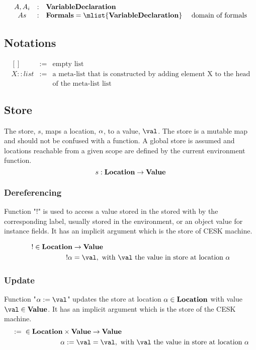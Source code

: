 \documentclass{article}
\begin{document}
\[
  \begin{array}{ccll}
	\formal, \formali{i} & : & \dvardecl\\
	\formals & : & \dformals = \mlist{\dvardecl} &\textrm{ domain of formals}\\

  \end{array}
\]

\subsection{Notations}
\label{subsec:notations}

\[
  \begin{array}{lcl}
    [] &:=& \textrm{empty list}\\
    X :: list &:=& \textrm{a meta-list that is constructed by adding element X to the head}\\
    && \textrm{of the meta-list list}
  \end{array}
\]

\subsection{Store}
\label{subsec:store-definition}
The store, $s$, maps a location, $\alpha$, to a value, $\val$. The store is a mutable map and should not be confused with a function. A global store is assumed and locations reachable from a given scope are defined by the current environment function.
\[s : \mathbf{Location} \rightarrow \mathbf{Value} \]
\subsubsection{Dereferencing}
\label{subsubsection:dereferecing}
\newcommand{\deref}[1]{!#1}
Function "$\deref{}$" is used to access a value stored in the stored with by the corresponding label, usually stored in the environment, or an object value for instance fields. It has an implicit argument which is the store of CESK machine.

\begin{align*}
  \deref{} \in \dlocation &\rightarrow \dval \\
  \deref{\loc} &=  \val, \textrm{ with $\val$ the value in store at location } \loc
\end{align*}
\subsubsection{Update}
\label{subsubsec:store-update}
\newcommand{\update}[2]{{#1} := {#2}}
Function "$\update{\loc}{\val}$" updates the store at location $\alpha \in \mathbf{Location}$ with value $\val \in \dval$. It has an implicit argument which is the store of the CESK machine.
\begin{align*}
  \update{}{} \in \dlocation \times \dval &\rightarrow  \dval\\
  \update{\loc}{\val} &= \val, \textrm{ with $\val$ the value in store at location $\loc$}
\end{align*}
\end{document}
